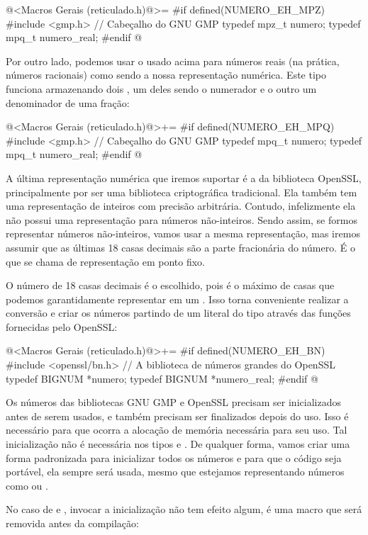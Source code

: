 \iniciocodigo
@<Macros Gerais (reticulado.h)@>=
#if defined(NUMERO_EH_MPZ)
#include <gmp.h> // Cabeçalho do GNU GMP
typedef mpz_t numero;
typedef mpq_t numero_real;
#endif
@
\fimcodigo

Por outro lado, podemos usar o  usado acima para
números reais (na prática, números racionais) como sendo a nossa
representação numérica. Este tipo funciona armazenando
dois , um deles sendo o numerador e o outro um
denominador de uma fração: 


\iniciocodigo
@<Macros Gerais (reticulado.h)@>+=
#if defined(NUMERO_EH_MPQ)
#include <gmp.h> // Cabeçalho do GNU GMP
typedef mpq_t numero;
typedef mpq_t numero_real;
#endif
@
\fimcodigo

A última representação numérica que iremos suportar é a da biblioteca
OpenSSL, principalmente por ser uma biblioteca criptográfica
tradicional. Ela também tem uma representação de inteiros com precisão
arbitrária. Contudo, infelizmente ela não possui uma
representação para números não-inteiros. Sendo assim, se formos
representar números não-inteiros, vamos usar a mesma representação,
mas iremos assumir que as últimas 18 casas decimais são a parte
fracionária do número. É o que se chama de representação em ponto
fixo.

O número de 18 casas decimais é o escolhido, pois é o máximo de casas
que podemos garantidamente representar em um . Isso torna conveniente realizar a conversão e criar os números
partindo de um literal do tipo  através das
funções fornecidas pelo OpenSSL:

\iniciocodigo
@<Macros Gerais (reticulado.h)@>+=
#if defined(NUMERO_EH_BN)
#include <openssl/bn.h> // A biblioteca de números grandes do OpenSSL
typedef BIGNUM *numero;
typedef BIGNUM *numero_real;
#endif
@
\fimcodigo

Os números das bibliotecas GNU GMP e OpenSSL precisam ser
inicializados antes de serem usados, e também precisam ser finalizados
depois do uso. Isso é necessário para que ocorra a alocação de memória
necessária para seu uso. Tal inicialização não é necessária nos
tipos  e . De qualquer forma, vamos
criar uma forma padronizada para inicializar todos os números e para
que o código seja portável, ela sempre será usada, mesmo que estejamos
representando números como  ou .

No caso de  e , invocar a
inicialização não tem efeito algum, é uma macro que será removida
antes da compilação:

